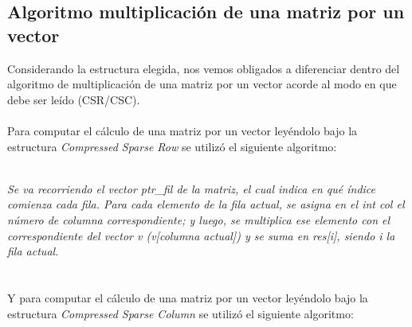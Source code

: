 \documentclass[a4paper]{article}
\begin{document}
\subsection{Algoritmo multiplicaci\'on de una matriz por un vector}
 Considerando la estructura elegida, nos vemos obligados a diferenciar dentro del algoritmo de multiplicaci\'on de una matriz por un vector acorde al modo en que debe ser le\'ido (CSR/CSC).\\
 \\
\indent Para computar el c\'alculo de una matriz por un vector ley\'endolo bajo la estructura \emph{Compressed Sparse Row} se utiliz\'o el siguiente algoritmo: \\
\IncMargin{1em}
\begin{algorithm}

\BlankLine
{}
\end{algorithm}\DecMargin{1em}
\\
\textit{Se va recorriendo el vector ptr_fil de la matriz, el cual indica en qu\'e \'indice comienza cada fila. Para cada elemento de la fila actual, se asigna en el int col el n\'umero de columna correspondiente; y luego, se multiplica ese elemento con el correspondiente del vector v (v[columna actual]) y se suma en res[i], siendo i la fila actual.}
\\
 \\
 \\
  \indent Y para computar el c\'alculo de una matriz por un vector ley\'endolo bajo la estructura \emph{Compressed Sparse Column} se utiliz\'o el siguiente algoritmo: \\
   \\
\IncMargin{1em}
\begin{algorithm}

\BlankLine
{}
\end{algorithm}\DecMargin{1em}
\\
\end{document}
